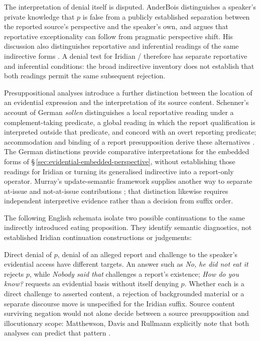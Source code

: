 The interpretation of denial itself is disputed. AnderBois distinguishes
a speaker's private knowledge that $p$ is false from a publicly
established separation between the reported source's perspective and the
speaker's own, and argues that reportative exceptionality can follow from
pragmatic perspective shift. His discussion also distinguishes reportative
and inferential readings of the same indirective forms
\cite[§§3.2--3.4]{anderbois2014}. A denial test for Iridian
/ therefore has separate reportative and inferential
conditions: the broad indirective inventory does not establish that both
readings permit the same subsequent rejection.

Presuppositional analyses introduce a further distinction between the
location of an evidential expression and the interpretation of its source
content. Schenner's account of German \textit{sollen} distinguishes a
local reportative reading under a complement-taking predicate, a global
reading in which the report qualification is interpreted outside that
predicate, and concord with an overt reporting predicate; accommodation
and binding of a report presupposition derive these alternatives
\cite[§§3.2, 4.2]{schenner2008}. The German distinctions provide
comparative interpretations for the embedded forms of
§\,\ref{sec:evidential-embedded-perspective}, without establishing those
readings for Iridian or turning its generalised indirective into a
report-only operator. Murray's update-semantic framework supplies another
way to separate at-issue and not-at-issue contributions
\cite{murray2017}; that distinction likewise requires independent
interpretive evidence rather than a decision from suffix order.

The following English schemata isolate two possible continuations to the
same indirectly introduced eating proposition. They identify semantic
diagnostics, not established Iridian continuation constructions or
judgements:

\pex\label{ex:evidential-denial-diagnostic}%
\a {}
\a {}
\xe

Direct denial of $p$, denial of an alleged report and challenge to the
speaker's evidential access have different targets. An answer such as
\textit{No, he did not eat it} rejects $p$, while \textit{Nobody said
that} challenges a report's existence; \textit{How do you know?} requests
an evidential basis without itself denying $p$. Whether each is a direct
challenge to asserted content, a rejection of backgrounded material or a
separate discourse move is unspecified for the Iridian suffix. Source
content surviving negation would not alone decide between a source
presupposition and illocutionary scope: Matthewson, Davis and Rullmann
explicitly note that both analyses can predict that pattern
\cite[§4.1.4]{matthewsondavisrullmann2007}.

